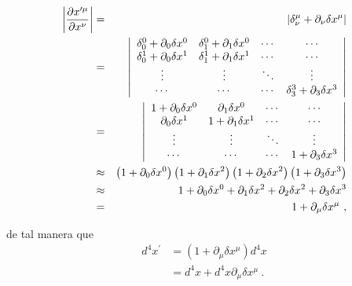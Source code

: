 \begin{eqnarray}
\left\vert \frac{\partial x^{\prime \mu }}{\partial x^{\nu }}\right\vert 
&=&\left\vert \delta _{\nu }^{\mu }+\partial _{\nu }\delta x^{\mu
}\right\vert   \notag \\
&=&\left\vert 
\begin{array}{cccc}
\delta _{0}^{0}+\partial _{0}\delta x^{0} & \delta _{1}^{0}+\partial
_{1}\delta x^{0} & \cdots  & \cdots  \\ 
\delta _{0}^{1}+\partial _{0}\delta x^{1} & \delta _{1}^{1}+\partial
_{1}\delta x^{1} & \cdots  & \cdots  \\ 
\vdots  & \vdots  & \ddots  & \vdots  \\ 
\cdots  & \cdots  & \cdots  & \delta _{3}^{3}+\partial _{3}\delta x^{3}%
\end{array}%
\right\vert   \notag \\
&=&\left\vert 
\begin{array}{cccc}
1+\partial _{0}\delta x^{0} & \partial _{1}\delta x^{0} & \cdots  & \cdots 
\\ 
\partial _{0}\delta x^{1} & 1+\partial _{1}\delta x^{1} & \cdots  & \cdots 
\\ 
\vdots  & \vdots  & \ddots  & \vdots  \\ 
\cdots  & \cdots  & \cdots  & 1+\partial _{3}\delta x^{3}
\end{array}%
\right\vert   \notag \\
&\approx &\left( 1+\partial _{0}\delta x^{0}\right) \left( 1+\partial_{1}\delta x^{2}\right) \left( 1+\partial _{2}\delta x^{2}\right) \left(1+\partial _{3}\delta x^{3}\right)   \notag \\
&\approx &1+\partial _{0}\delta x^{0}+\partial _{1}\delta x^{2}+\partial_{2}\delta x^{2}+\partial _{3}\delta x^{3}  \notag \\
&=&1+\partial _{\mu }\delta x^{\mu }~,
\end{eqnarray}

\noindent
de tal manera que
\begin{equation}
\begin{split}
        d^{4}x^{\prime}&=\left(1+\partial _{\mu }\delta x^{\mu } \right)d^{4}x \\
        &=d^{4}x+d^{4}x\partial _{\mu }\delta x^{\mu }~.
\end{split}
\end{equation}

